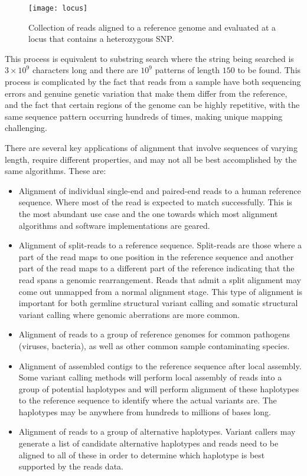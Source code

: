 \begin{figure}[H]
    \texttt{[image: locus]}
    \centering
    \caption {Collection of reads aligned to a reference genome and evaluated at a locus that contains a heterozygous SNP.}
    \label{fig:bg_locus}
\end{figure}

This process is equivalent to substring search where the string being searched is $3\times10^9$ characters long and there are $10^9$ patterns of length $150$ to be found. This process is complicated by the fact that reads from a sample have both sequencing errors and genuine genetic variation that make them differ from the reference, and the fact that certain regions of the genome can be highly repetitive, with the same sequence pattern occurring hundreds of times, making unique mapping challenging.

There are several key applications of alignment that involve sequences of varying length, require different properties, and may not all be best accomplished by the same algorithms. These are:

\begin{itemize}
    \item Alignment of individual single-end and paired-end reads to a human reference sequence. Where most of the read is expected to match successfully. This is the most abundant use case and the one towards which most alignment algorithms and software implementations are geared.
    \item Alignment of split-reads to a reference sequence. Split-reads are those where a part of the read maps to one position in the reference sequence and another part of the read maps to a different part of the reference indicating that the read spans a genomic rearrangement. Reads that admit a split alignment may come out unmapped from a normal alignment stage. This type of alignment is important for both germline structural variant calling and somatic structural variant calling where genomic aberrations are more common.
    \item Alignment of reads to a group of reference genomes for common pathogens (viruses, bacteria), as well as other common sample contaminating species.
    \item Alignment of assembled contigs to the reference sequence after local assembly. Some variant calling methods will perform local assembly of reads into a group of potential haplotypes and will perform alignment of these haplotypes to the reference sequence to identify where the actual variants are. The haplotypes may be anywhere from hundreds to millions of bases long.
    \item Alignment of reads to a group of alternative haplotypes. Variant callers may generate a list of candidate alternative haplotypes and reads need to be aligned to all of these in order to determine which haplotype is best supported by the reads data.      
\end{itemize}


